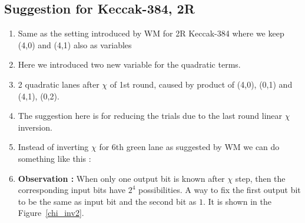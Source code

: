 \documentclass{article}
\begin{document}
\subsection{Suggestion for Keccak-384, 2R}
\begin{enumerate}
    \item Same as the setting introduced by WM for 2R Keccak-384 where we keep (4,0) and (4,1) also as variables
    \item Here we introduced two new variable for the quadratic terms.
    \item 2 quadratic lanes after $\chi$ of 1st round, caused by product of (4,0), (0,1) and (4,1), (0,2).
    \item The suggestion here is for reducing the trials due to the last round linear $\chi$ inversion.
    \item Instead of inverting $\chi$ for 6th green lane as suggested by WM we can do something like this :
    \item \label{ob2}\textbf{Observation :} When only one output bit is known after $\chi$ step, then the corresponding input bits have $2^4$ possibilities. A way to fix the first output bit to be the same as input bit and the second bit as $1$. It is shown in the Figure~\ref{chi_inv2}.
\begin{figure}[ht]
\begin{center}
\end{center}
\end{figure}
\end{enumerate}
\end{document}
